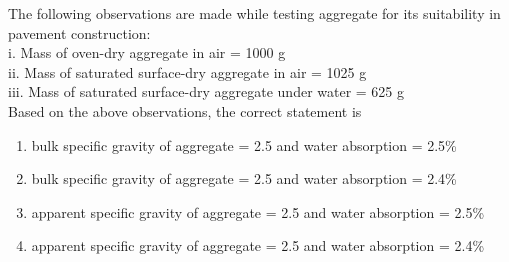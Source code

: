 \item The following observations are made while testing aggregate for its suitability in pavement construction:\\
i. Mass of oven-dry aggregate in air = 1000 g\\
ii. Mass of saturated surface-dry aggregate in air = 1025 g\\
iii. Mass of saturated surface-dry aggregate under water = 625 g\\
Based on the above observations, the correct statement is
\begin{multicols}{2}
    \begin{enumerate}
        \item bulk specific gravity of aggregate = 2.5 and water absorption = 2.5\%
        \item bulk specific gravity of aggregate = 2.5 and water absorption = 2.4\%
        \item apparent specific gravity of aggregate = 2.5 and water absorption = 2.5\%
        \item apparent specific gravity of aggregate = 2.5 and water absorption = 2.4\%
    \end{enumerate}
\end{multicols}

